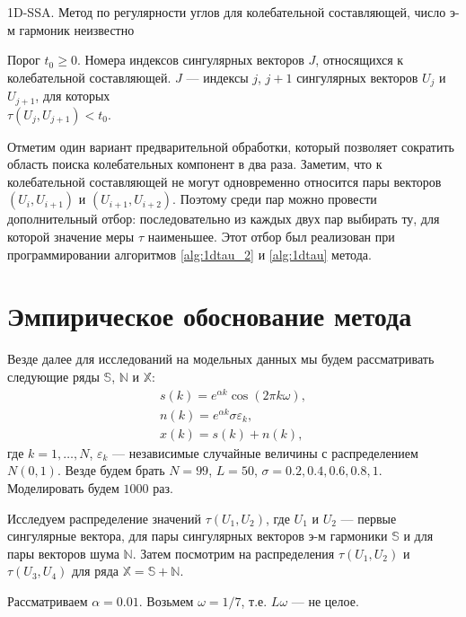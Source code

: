 \documentclass[specialist,
               substylefile = spbu.rtx,
               subf,href,colorlinks=true, 12pt]{disser}
\begin{document}
\begin{algorithm}[!hhh]
\caption{1D-SSA. Метод по регулярности углов для колебательной составляющей, число э-м гармоник неизвестно}
\label{alg:1dtau}
\begin{algorithmic}[1]
\REQUIRE Порог $t_0 \geqslant 0$.
\ENSURE Номера индексов сингулярных векторов $J$, относящихся к колебательной составляющей.
\STATE  $J$ --- индексы $j$, $j+1$ сингулярных векторов $U_j$ и $U_{j+1}$, для которых\\ $\tau(U_j, U_{j+1}) < t_0$.
\end{algorithmic}
\end{algorithm}

Отметим один вариант предварительной обработки, который позволяет сократить область поиска колебательных компонент в два раза.
Заметим, что к колебательной составляющей не могут одновременно относится пары векторов $(U_i, U_{i+1})$ и $(U_{i+1}, U_{i+2})$. Поэтому среди пар можно провести дополнительный отбор: последовательно из каждых двух пар выбирать ту, для которой значение меры $\tau$ наименьшее. Этот отбор был реализован при программировании алгоритмов \ref{alg:1dtau_2} и \ref{alg:1dtau} метода. 


\section{Эмпирическое обоснование метода}
\label{sec:tau_study}
Везде далее для исследований на модельных данных мы будем рассматривать следующие ряды $\mathbb{S}$, $\mathbb{N}$ и $\mathbb{X}$:
\begin{gather} \label{eq:series_S_N}
s(k) =  e^{\alpha k} \cos(2\pi k \omega), \\  \label{eq:series_N_N}
n(k) =  e^{\alpha k} \sigma \varepsilon_k, \\ \label{eq:series_X_N}
x(k) = s(k) + n(k),
\end{gather}
где $k=1,\ldots,N$, $\varepsilon_k$ --- независимые случайные величины с распределением $N(0,1)$. Везде будем брать $N = 99$, $L = 50$, $\sigma = 0.2, 0.4, 0.6, 0.8, 1$. Моделировать будем $1000$ раз.

Исследуем распределение
 значений $\tau(U_1, U_2)$, где $U_1$ и $U_2$ --- первые сингулярные вектора, для пары сингулярных векторов э-м гармоники $\mathbb{S}$ и для пары векторов шума $\mathbb{N}$. Затем посмотрим на распределения  $\tau(U_1, U_2)$ и  $\tau(U_3, U_4)$ для ряда $\mathbb{X} = \mathbb{S} + \mathbb{N}$.

Рассматриваем $\alpha = 0.01$. Возьмем $\omega = 1/7$, т.е. $L\omega$ --- не целое.
\end{document}
